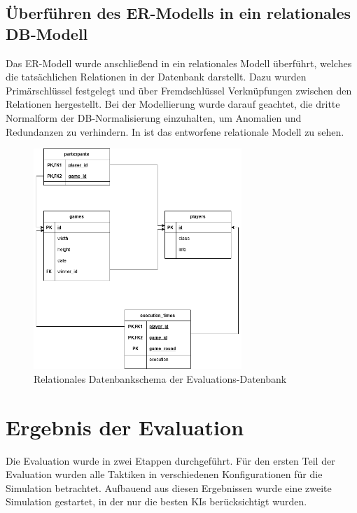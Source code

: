 \subsection{Überführen des \ac{ER}-Modells in ein relationales \acl{DB}-Modell}
\label{subsec:db-schema}

Das \ac{ER}-Modell wurde anschließend in ein relationales Modell überführt, welches die tatsächlichen Relationen in der
Datenbank darstellt.
Dazu wurden Primärschlüssel festgelegt und über Fremdschlüssel Verknüpfungen zwischen den Relationen hergestellt.
Bei der Modellierung wurde darauf geachtet, die dritte Normalform der \ac{DB}-Normalisierung einzuhalten,
um Anomalien und Redundanzen zu verhindern.
In  ist das entworfene relationale Modell zu sehen.

\begin{figure}[htb]
	\centering
	\includegraphics[width=0.7\textwidth]{Bilder/relationales_db_schema.png}
	\caption{Relationales Datenbankschema der Evaluations-Datenbank}
	\label{fig:relationales-db-schema}
\end{figure}

\section{Ergebnis der Evaluation}
\label{sec:ergebnis-evaluation}

Die Evaluation wurde in zwei Etappen durchgeführt.
Für den ersten Teil der Evaluation wurden alle Taktiken in verschiedenen Konfigurationen für die Simulation betrachtet.
Aufbauend aus diesen Ergebnissen wurde eine zweite Simulation gestartet, in der nur die besten \ac{KI}s berücksichtigt
wurden.


